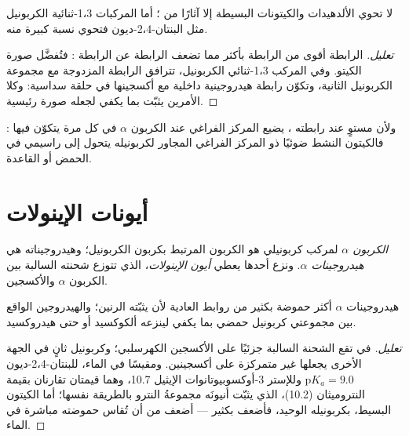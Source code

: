 \begin{proposition}\label{prop:b2:enolates-aldol:enol-content}
لا تحوي الألدهيدات والكيتونات البسيطة إلا آثارًا من ؛ أما المركبات 1،3-ثنائية الكربونيل مثل
البنتان-2،4-ديون فتحوي نسبة كبيرة منه.
\end{proposition}

\begin{proof}[تعليل]
الرابطة  أقوى من الرابطة  بأكثر مما تضعف الرابطة  عن الرابطة :
فتُفضَّل صورة الكيتو. وفي المركب 1،3-ثنائي الكربونيل، تترافق الرابطة المزدوجة 
مع مجموعة الكربونيل الثانية، وتكوّن   رابطة هيدروجينية داخلية مع أكسجينها
في حلقة سداسية: وكلا الأمرين يثبّت  بما يكفي لجعله صورة رئيسية.
\end{proof}

ولأن  مستوٍ عند رابطته ، يضيع المركز الفراغي عند الكربون $\alpha$ في كل مرة
يتكوّن فيها : فالكيتون النشط ضوئيًا ذو المركز الفراغي المجاور لكربونيله يتحول إلى راسيمي في الحمض
أو القاعدة.

\section{أيونات الإينولات}

\begin{definition}\label{def:b2:enolates-aldol:enolate}
\emph{الكربون $\alpha$} لمركب كربونيلي هو الكربون
المرتبط بكربون الكربونيل؛ وهيدروجيناته هي \emph{هيدروجينات $\alpha$}.
ونزع أحدها يعطي \emph{أيون الإينولات}، الذي تتوزع
شحنته السالبة بين الكربون $\alpha$ والأكسجين.
\end{definition}

\begin{proposition}\label{prop:b2:enolates-aldol:alpha-acidity}
هيدروجينات $\alpha$ أكثر حموضة بكثير من روابط  العادية لأن  يثبّته
الرنين؛ والهيدروجين الواقع بين مجموعتي كربونيل حمضي بما يكفي لينزعه ألكوكسيد أو
حتى هيدروكسيد.
\end{proposition}

\begin{proof}[تعليل]
في  تقع الشحنة السالبة جزئيًا على الأكسجين الكهرسلبي؛ وكربونيل ثانٍ في
الجهة الأخرى يجعلها غير متمركزة على أكسجينين. ومقيسًا في الماء، للبنتان-2،4-ديون $\mathrm pK_a =
9.0$ وللإستر 3-أوكسوبيوتانوات الإيثيل 10.7، وهما قيمتان تقارنان بقيمة النتروميثان (10.2)، الذي يثبّت أنيونَه
مجموعةُ النترو بالطريقة نفسها؛ أما الكيتون البسيط، بكربونيله الوحيد، فأضعف بكثير --- أضعف من
أن تُقاس حموضته مباشرة في الماء.
\end{proof}

